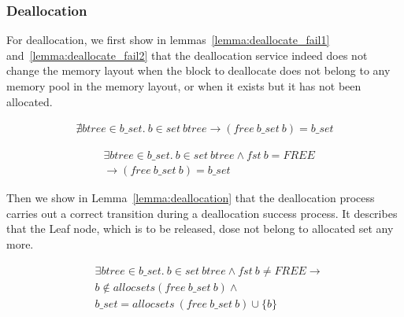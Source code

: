 \subsubsection{Deallocation}\label{sec:functionalDealloc}
For deallocation, we first show in lemmas~\ref{lemma:deallocate_fail1} and~\ref{lemma:deallocate_fail2} that the deallocation service indeed does not change the memory layout when the block to deallocate does not belong to any memory pool in the memory layout, or when it exists but it has not been allocated. 


\begin{lemma} 
\label{lemma:deallocate_fail1}
\end{lemma}
\vspace{-7pt}
{\footnotesize
\begin{align*}
\nexists btree \in b\_set.\ b \in set\ btree \longrightarrow (free\ b\_set\ b) = b\_set
\end{align*}
}
\vspace{-12pt}
	
\begin{lemma} 
\label{lemma:deallocate_fail2}
\end{lemma}
\vspace{-7pt}
{\footnotesize
\begin{align*}
&\exists btree \in b\_set.\ b \in set\ btree \wedge fst\ b = FREE \\
&\longrightarrow (free\ b\_set\ b) = b\_set
\end{align*}
}
\vspace{-12pt}

Then we show in Lemma~\ref{lemma:deallocation} that the deallocation process carries out a correct transition during a deallocation success process. It describes that the Leaf node, which is to be released, dose not belong to allocated set any more.

\begin{lemma} 
\label{lemma:deallocation}
\end{lemma}
\vspace{-7pt}
{\footnotesize
\begin{align*}
&\exists btree \in b\_set.\ b \in set\ btree \wedge fst\ b \neq FREE \longrightarrow \\ 
& b\notin allocsets (free\ b\_set\ b) \wedge \\
& b\_set = allocsets\ (free\ b\_set\ b) \cup \lbrace b \rbrace
\end{align*}
}
\vspace{-12pt}

